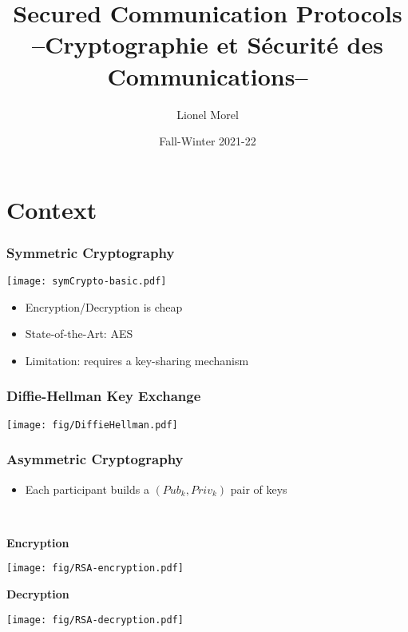 \documentclass[
hyperref={pdfpagelabels=false}
,xcolor=table
]
{beamer}
\title[CSC - Intro]{Secured Communication Protocols \\ --Cryptographie et Sécurité des Communications--}
\author[]{Lionel Morel}
\institute[]{Telecommunications - INSA Lyon}
\date{Fall-Winter 2021-22}
\begin{document}
\begin{frame}
  \maketitle
\end{frame}

\section{Context}


\begin{frame}
  \frametitle{Symmetric Cryptography}

  \begin{center}
    \texttt{[image: symCrypto-basic.pdf]}
  \end{center}

  \begin{itemize}
  \item Encryption/Decryption is cheap
  \item State-of-the-Art: AES
  \item Limitation: requires a key-sharing mechanism
  \end{itemize}
  
\end{frame}


\begin{frame}
  \frametitle{Diffie-Hellman Key Exchange}
  \begin{center}
    \texttt{[image: fig/DiffieHellman.pdf]}
  \end{center}
\end{frame}


\begin{frame}
  \frametitle{Asymmetric Cryptography}

  \begin{itemize}
  \item Each participant builds a $(Pub_k, Priv_k)$ pair of keys
  \end{itemize}

\
  
  \begin{minipage}[t]{.45\textwidth}
    \textbf{Encryption}
    
    \texttt{[image: fig/RSA-encryption.pdf]}
  \end{minipage}
  \hfill
  \begin{minipage}[t]{.45\textwidth}
   \textbf{Decryption}

   \texttt{[image: fig/RSA-decryption.pdf]}
  \end{minipage}
  
\end{frame}
\end{document}
